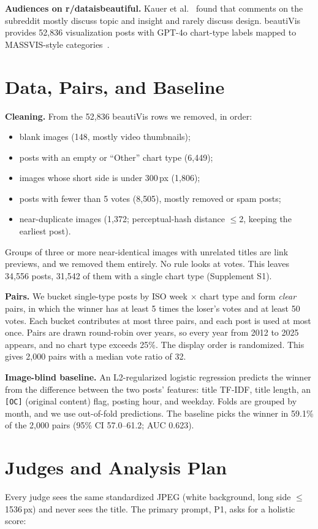 \documentclass{vgtc}
\begin{document}
\textbf{Audiences on r/dataisbeautiful.} Kauer et al.~\cite{kauer2021public} found that comments on the subreddit mostly discuss topic and insight and rarely discuss design. beautiVis~\cite{lin2026beautivis} provides 52{,}836 visualization posts with GPT-4o chart-type labels mapped to MASSVIS-style categories~\cite{borkin2013memorable}.

\section{Data, Pairs, and Baseline}
\textbf{Cleaning.} From the 52{,}836 beautiVis rows we removed, in order:
\begin{itemize}
\item blank images (148, mostly video thumbnails);
\item posts with an empty or ``Other'' chart type (6{,}449);
\item images whose short side is under 300\,px (1{,}806);
\item posts with fewer than 5 votes (8{,}505), mostly removed or spam posts;
\item near-duplicate images (1{,}372; perceptual-hash distance $\le$2, keeping the earliest post).
\end{itemize}
Groups of three or more near-identical images with unrelated titles are link previews, and we removed them entirely. No rule looks at votes. This leaves 34{,}556 posts, 31{,}542 of them with a single chart type (Supplement S1).

\textbf{Pairs.} We bucket single-type posts by ISO week $\times$ chart type and form \emph{clear} pairs, in which the winner has at least 5 times the loser's votes and at least 50 votes. Each bucket contributes at most three pairs, and each post is used at most once. Pairs are drawn round-robin over years, so every year from 2012 to 2025 appears, and no chart type exceeds 25\%. The display order is randomized. This gives 2{,}000 pairs with a median vote ratio of 32.

\textbf{Image-blind baseline.} An L2-regularized logistic regression predicts the winner from the difference between the two posts' features: title TF-IDF, title length, an \texttt{[OC]} (original content) flag, posting hour, and weekday. Folds are grouped by month, and we use out-of-fold predictions. The baseline picks the winner in 59.1\% of the 2{,}000 pairs (95\% CI 57.0--61.2; AUC 0.623).

\section{Judges and Analysis Plan}
Every judge sees the same standardized JPEG (white background, long side $\le$1536\,px) and never sees the title. The primary prompt, P1, asks for a holistic score:
\end{document}
